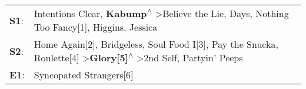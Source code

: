 \begin{supertabular}{p{0.03\textwidth}p{0.92\textwidth}}
 \textbf{S1}:  &                                                         Intentions Clear\textsuperscript{}, \enspace \textbf{Kabump\textsuperscript{$\wedge$}} \textgreater \enspace Believe the Lie\textsuperscript{},  Days\textsuperscript{}, \enspace Nothing Too Fancy[1]\textsuperscript{}, \enspace Higgins\textsuperscript{}, \enspace Jessica\textsuperscript{}  \enspace  \\
 \textbf{S2}:  &  Home Again[2]\textsuperscript{}, \enspace Bridgeless\textsuperscript{}, \enspace Soul Food I[3]\textsuperscript{}, \enspace Pay the Snucka\textsuperscript{}, \enspace Roulette[4]\textsuperscript{} \textgreater \enspace \textbf{Glory[5]\textsuperscript{$\wedge$}} \textgreater \enspace 2nd Self\textsuperscript{}, \enspace Partyin' Peeps\textsuperscript{}  \enspace  \\
 \textbf{E1}:  &                                                                                                                                                                                                                                                                                                                           Syncopated Strangers[6]\textsuperscript{}  \enspace  \\
\end{supertabular}
